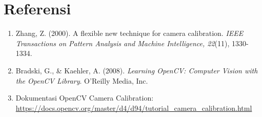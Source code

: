 \documentclass[12pt,a4paper]{article}
\begin{document}
\section*{Referensi}
\begin{enumerate}
    \item Zhang, Z. (2000). A flexible new technique for camera calibration. \textit{IEEE
              Transactions on Pattern Analysis and Machine Intelligence, 22}(11), 1330-1334.
    \item Bradski, G., \& Kaehler, A. (2008). \textit{Learning OpenCV: Computer Vision
              with the OpenCV Library}. O'Reilly Media, Inc.
    \item Dokumentasi OpenCV Camera Calibration:
          \url{https://docs.opencv.org/master/d4/d94/tutorial_camera_calibration.html}
\end{enumerate}
\end{document}
